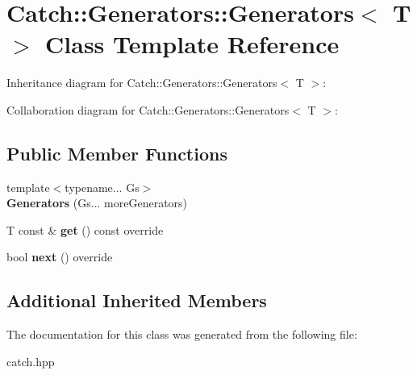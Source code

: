 \hypertarget{classCatch_1_1Generators_1_1Generators}{}\section{Catch\+:\+:Generators\+:\+:Generators$<$ T $>$ Class Template Reference}
\label{classCatch_1_1Generators_1_1Generators}


Inheritance diagram for Catch\+:\+:Generators\+:\+:Generators$<$ T $>$\+:


Collaboration diagram for Catch\+:\+:Generators\+:\+:Generators$<$ T $>$\+:
\subsection*{Public Member Functions}
\begin{DoxyCompactItemize}
\item 
\mbox{\label{classCatch_1_1Generators_1_1Generators_a0288170b30cd0fdfef6efc2d9bc8acba}} 
{\footnotesize template$<$typename... Gs$>$ }\\{\bfseries Generators} (Gs... more\+Generators)
\item 
\mbox{\label{classCatch_1_1Generators_1_1Generators_a66705482b7efa88cae6e6b7062d5de6a}} 
T const  \& {\bfseries get} () const override
\item 
\mbox{\label{classCatch_1_1Generators_1_1Generators_ad127fd2a07347b527f79ab3b78bd40fb}} 
bool {\bfseries next} () override
\end{DoxyCompactItemize}
\subsection*{Additional Inherited Members}


The documentation for this class was generated from the following file\+:\begin{DoxyCompactItemize}
\item 
catch.\+hpp\end{DoxyCompactItemize}
